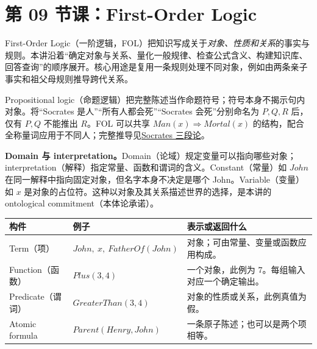 \begingroup
\renewcommand{\recordid}[1]{}
\renewcommand{\relatedexercise}[2]{\hyperref[exercise:#1]{#2}}

\section{第 09 节课：First-Order Logic}
\label{lecture:SC3000-L09}


First-Order Logic（一阶逻辑，FOL）把知识写成关于\emph{对象、性质和关系}的事实与规则。本讲沿着“确定对象与关系、量化一般规律、检查公式含义、构建知识库、回答查询”的顺序展开。核心用途是复用一条规则处理不同对象，例如由两条亲子事实和祖父母规则推导跨代关系。


Propositional logic（命题逻辑）把完整陈述当作命题符号；符号本身不揭示句内对象。将“Socrates 是人”“所有人都会死”“Socrates 会死”分别命名为 $P,Q,R$ 后，仅有 $P,Q$ 不能推出 $R$。FOL 可以共享 $Man(x)\Rightarrow Mortal(x)$ 的结构，配合全称量词应用于不同人；完整推导见\relatedexercise{SC3000-L09-E01}{Socrates 三段论}。

\textbf{Domain 与 interpretation。}Domain（论域）规定变量可以指向哪些对象；interpretation（解释）指定常量、函数和谓词的含义。Constant（常量）如 $John$ 在同一解释中指向固定对象，但名字本身不决定是哪个 John。Variable（变量）如 $x$ 是对象的占位符。这种以对象及其关系描述世界的选择，是本讲的 ontological commitment（本体论承诺）。

\begin{center}
\small
\begin{tabularx}{\textwidth}{@{}l l X@{}}
\toprule
构件 & 例子 & 表示或返回什么 \\
\midrule
Term（项） & $John,\ x,\ FatherOf(John)$ & 对象；可由常量、变量或函数应用构成。 \\
Function（函数） & $Plus(3,4)$ & 一个对象，此例为 $7$。每组输入对应一个确定输出。 \\
Predicate（谓词） & $GreaterThan(3,4)$ & 对象的性质或关系，此例真值为假。 \\
Atomic formula & $Parent(Henry,John)$ & 一条原子陈述；也可以是两个项相等。 \\
\bottomrule
\end{tabularx}
\end{center}

